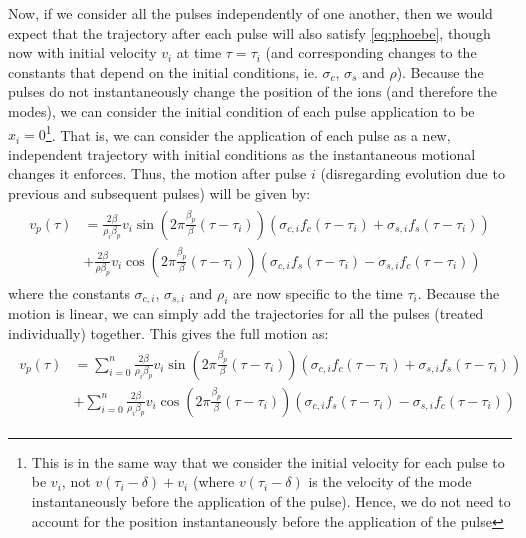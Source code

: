 \documentclass{article}
\begin{document}
\noindent Now, if we consider all the pulses independently of one another, then we would expect that the trajectory after each pulse will also satisfy \eqref{eq:phoebe}, though now with initial velocity $v_i$ at time $\tau = \tau_i$ (and corresponding changes to the constants that depend on the initial conditions, ie. $\sigma_c$, $\sigma_s$ and $\rho$). Because the pulses do not instantaneously change the position of the ions (and therefore the modes), we can consider the initial condition of each pulse application to be $x_i = 0$\footnote{This is in the same way that we consider the initial velocity for each pulse to be $v_i$, not $v(\tau_i - \delta) + v_i$ (where $v(\tau_i - \delta)$ is the velocity of the mode instantaneously before the application of the pulse). Hence, we do not need to account for the position instantaneously before the application of the pulse}. That is, we can consider the application of each pulse as a new, independent trajectory with initial conditions as the instantaneous motional changes it enforces. Thus,  the motion after pulse $i$ (disregarding evolution due to previous and subsequent pulses) will be given by:
\begin{align}
	\begin{split}
v_p (\tau) & = \frac{2 \beta}{\rho_i \beta_p} v_i \sin \left( 2 \pi \frac{\beta_p}{\beta} (\tau - \tau_i) \right) (\sigma_{c,i} f_c (\tau - \tau_i) + \sigma_{s,i} f_s (\tau - \tau_i)) \\
&+ \frac{2 \beta}{\rho \beta_p} v_i \cos \left( 2 \pi \frac{\beta_p}{\beta} (\tau - \tau_i) \right) (\sigma_{c,i} f_s (\tau - \tau_i) - \sigma_{s,i} f_c (\tau - \tau_i))
\end{split} \label{eq:phoebe2}
\end{align}
where the constants $\sigma_{c,i}$, $\sigma_{s,i}$ and $\rho_i$ are now specific to the time $\tau_i$. Because the motion is linear, we can simply add the trajectories for all the pulses (treated individually) together. This gives the full motion as:
\begin{align}
\begin{split}
v_p (\tau) &= \sum_{i=0}^n \frac{2 \beta}{\rho_i \beta_p} v_i \sin \left( 2 \pi \frac{\beta_p}{\beta} (\tau - \tau_i) \right) (\sigma_{c,i} f_c (\tau - \tau_i) + \sigma_{s,i} f_s (\tau - \tau_i)) \\
&+ \sum_{i = 0}^n \frac{2 \beta}{\rho_i \beta_p} v_i \cos \left( 2 \pi \frac{\beta_p}{\beta} (\tau - \tau_i) \right) (\sigma_{c,i} f_s (\tau - \tau_i) - \sigma_{s,i} f_c (\tau - \tau_i))
\end{split}
\end{align}
\end{document}
